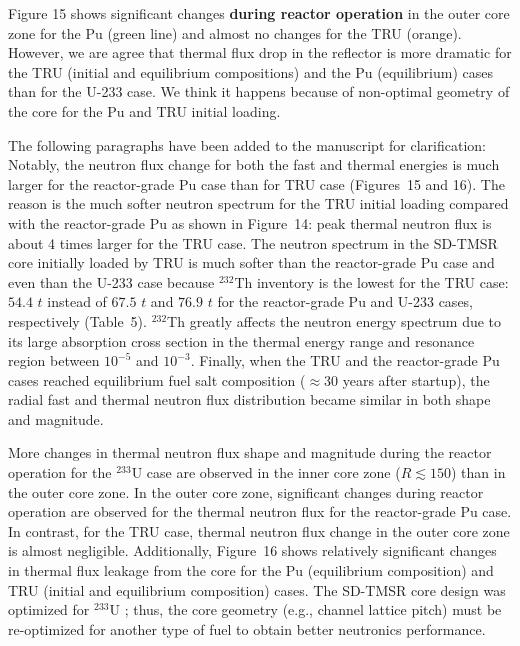 \documentclass[answers,11pt]{exam}
\begin{document}
\begin{questions}
\begin{solution}
                Figure 15 shows 
				significant changes \textbf{during reactor operation} in the 
				outer core zone for the Pu (green line) and almost no changes 
				for the TRU (orange). However, we are agree that thermal flux 
				drop in the reflector is more dramatic for the TRU (initial 
				and equilibrium compositions) and the Pu (equilibrium) cases 
				than for the U-233 case. We think it happens because of 
				non-optimal geometry of the core for the Pu and TRU initial 
				loading.			
				
				The following paragraphs have been added to the manuscript for 
				clarification:\\
				
				Notably, the neutron flux change for both the fast and thermal 
				energies is much larger for the reactor-grade Pu case than for 
				TRU case (Figures~15 and 16). The reason is the much softer 
				neutron spectrum for the TRU initial loading compared with the 
				reactor-grade Pu as shown in Figure~14: peak thermal neutron 
				flux is about 4 times larger for the TRU case. The neutron 
				spectrum in the SD-TMSR core initially loaded by TRU is much 
				softer than the reactor-grade Pu case and even than the U-233 
				case because $^{232}$Th inventory is the lowest for the TRU 
				case: $54.4$ $t$ instead of $67.5$ $t$ and $76.9$ $t$ for the reactor-grade  
				Pu and U-233 cases, respectively (Table~5). $^{232}$Th greatly 
				affects the neutron energy spectrum due to its large 
				absorption cross section in the thermal energy range and 
				resonance region between $10^{-5}$ and $10^{-3}$. Finally, 
				when the TRU and the reactor-grade Pu cases reached 
				equilibrium fuel salt composition ($\approx 30$ years after 
				startup), the radial fast and thermal neutron flux 
				distribution became similar in both shape and magnitude.
				
				More changes in thermal neutron flux shape and magnitude 
				during the reactor operation for the $^{233}$U case are 
				observed in the inner core zone ($R\lesssim150$) than in the 
				outer core zone. In the outer core zone, significant changes 
				during reactor operation are observed for the thermal 
				neutron flux for the reactor-grade Pu case. In contrast, for 
				the TRU case, thermal neutron flux change in the outer core 
				zone  is almost negligible. Additionally, 
				Figure~16 shows relatively significant changes in thermal flux 
				leakage from the core for the Pu (equilibrium composition) and 
				TRU (initial and equilibrium composition) cases. The SD-TMSR 
				core design was optimized for $^{233}$U  				
				\cite{li_optimization_2018}; thus, the core geometry (e.g., 
				channel lattice pitch) must be re-optimized for another type 
				of fuel to obtain better neutronics performance.
        \end{solution}


\end{questions}
\end{document}
